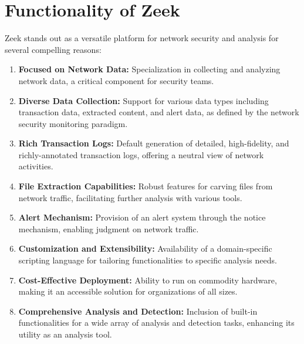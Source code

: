 \section{Functionality of Zeek}
Zeek stands out as a versatile platform for network security and analysis for several compelling reasons:
\begin{enumerate}
    \item \textbf{Focused on Network Data:} Specialization in collecting and analyzing network data, a critical component for security teams.
    
    \item \textbf{Diverse Data Collection:} Support for various data types including transaction data, extracted content, and alert data, as defined by the network security monitoring paradigm.
    
    \item \textbf{Rich Transaction Logs:} Default generation of detailed, high-fidelity, and richly-annotated transaction logs, offering a neutral view of network activities.
    
    \item \textbf{File Extraction Capabilities:} Robust features for carving files from network traffic, facilitating further analysis with various tools.
    
    \item \textbf{Alert Mechanism:} Provision of an alert system through the notice mechanism, enabling judgment on network traffic.
    
    \item \textbf{Customization and Extensibility:} Availability of a domain-specific scripting language for tailoring functionalities to specific analysis needs.
    
    \item \textbf{Cost-Effective Deployment:} Ability to run on commodity hardware, making it an accessible solution for organizations of all sizes.
    
    \item \textbf{Comprehensive Analysis and Detection:} Inclusion of built-in functionalities for a wide array of analysis and detection tasks, enhancing its utility as an analysis tool.
\end{enumerate}
